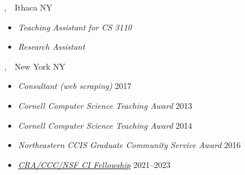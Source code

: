 \documentclass{article}
\begin{document}
,~~Ithaca NY
\begin{itemize}
  \item \emph{Teaching Assistant for CS 3110} \hfill {}
  \item \emph{Research Assistant} \hfill {}
\end{itemize}

,~~New York NY
\begin{itemize}
  \item \emph{Consultant (web scraping)} \hfill 2017
\end{itemize}


\newpage
{} %
\begin{itemize}
  \item \emph{Cornell Computer Science Teaching Award} \hfill 2013
  \item \emph{Cornell Computer Science Teaching Award} \hfill 2014
  \item \emph{Northeastern CCIS Graduate Community Service Award} \hfill 2016
  \item \href{https://cifellows2020.org}{\emph{CRA/CCC/NSF CI Fellowship}} \hfill 2021--2023
\end{itemize}
\end{document}
